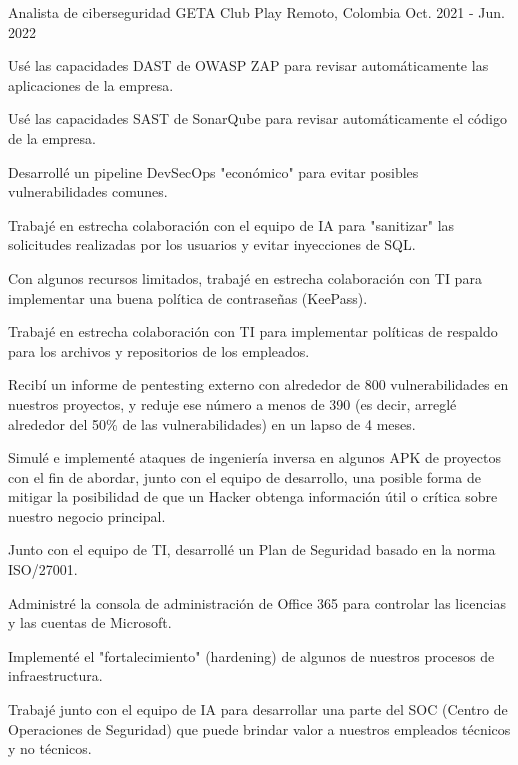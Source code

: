 \begin{cventries}
  \cventry
    {Analista de ciberseguridad} %
    {GETA Club Play} %
    {Remoto, Colombia} %
    {Oct. 2021 - Jun. 2022} %
    {
      \begin{cvitems} %
        \item {Usé las capacidades DAST de OWASP ZAP para revisar automáticamente las aplicaciones de la empresa.}
        \item {Usé las capacidades SAST de SonarQube para revisar automáticamente el código de la empresa.}
        \item {Desarrollé un pipeline DevSecOps "económico" para evitar posibles vulnerabilidades comunes.}
        \item {Trabajé en estrecha colaboración con el equipo de IA para "sanitizar" las solicitudes realizadas por los usuarios y evitar inyecciones de SQL.}
        \item {Con algunos recursos limitados, trabajé en estrecha colaboración con TI para implementar una buena política de contraseñas (KeePass).}
        \item {Trabajé en estrecha colaboración con TI para implementar políticas de respaldo para los archivos y repositorios de los empleados.}
        \item {Recibí un informe de pentesting externo con alrededor de 800 vulnerabilidades en nuestros proyectos, y reduje ese número a menos de 390 (es decir, arreglé alrededor del 50\% de las vulnerabilidades) en un lapso de 4 meses.}
        \item {Simulé e implementé ataques de ingeniería inversa en algunos APK de proyectos con el fin de abordar, junto con el equipo de desarrollo, una posible forma de mitigar la posibilidad de que un Hacker obtenga información útil o crítica sobre nuestro negocio principal.}
        \item {Junto con el equipo de TI, desarrollé un Plan de Seguridad basado en la norma ISO/27001.}
        \item {Administré la consola de administración de Office 365 para controlar las licencias y las cuentas de Microsoft.}
        \item {Implementé el "fortalecimiento" (hardening) de algunos de nuestros procesos de infraestructura.}
        \item {Trabajé junto con el equipo de IA para desarrollar una parte del SOC (Centro de Operaciones de Seguridad) que puede brindar valor a nuestros empleados técnicos y no técnicos.}
      \end{cvitems}
    }


\end{cventries}
